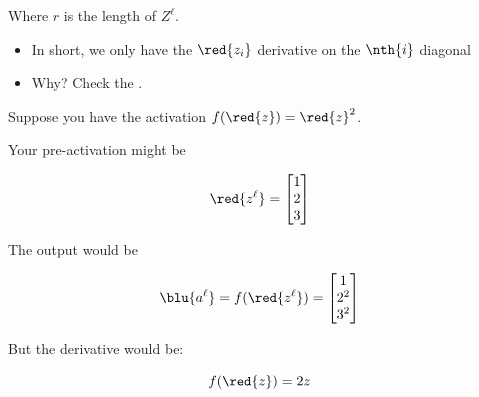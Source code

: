 \begin{notation}
            Where $r$ is the length of $Z^\ell$.

            \begin{itemize}
                \item In short, we only have the $\red{z_i}$ derivative on the $\nth{i}$ diagonal
                \item Why? Check the .
            \end{itemize}
        \end{notation}

        
        
        \miniex Suppose you have the activation $f(\red{z}) = \red{z}^2$.
        
        Your pre-activation might be 
        
        \begin{equation}
            \red{z^\ell} = 
            \begin{bmatrix}
                1 \\ 2 \\ 3
            \end{bmatrix}
        \end{equation}
        
        The output would be 
        
        \begin{equation}
            \blu{a^\ell} 
            = 
            f(\red{z^\ell})
            = 
            \begin{bmatrix}
                1 \\ 2^2 \\ 3^2
            \end{bmatrix}
        \end{equation}
        
        But the derivative would be:
        
        \begin{equation}
            f(\red{z}) = 2z
        \end{equation}
        
